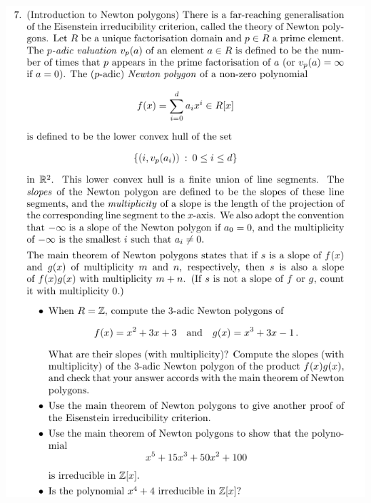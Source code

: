 \documentclass[12pt,letterpaper,boxed]{hmcpset}
\begin{document}
\newpage


\begin{problem}
	\includegraphics[scale=0.8]{7.png}
	\hfill
\end{problem}
\end{document}

